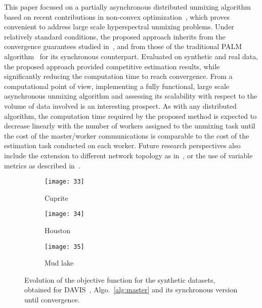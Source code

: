 \documentclass[journal,final,letterpaper,twoside,twocolumn]{IEEEtran}
\begin{document}
This paper focused on a partially asynchronous distributed unmixing algorithm based on recent contributions in non-convex optimization~\cite{Cannelli2016,Chang2016,Davis2016}, which proves convenient to address large scale hyperspectral unmixing problems. Under relatively standard conditions, the proposed approach inherits from the convergence guarantees studied in~\cite{Cannelli2016}, and from those of the traditional PALM algorithm~\cite{Bolte2013,Chouzenoux2016} for its synchronous counterpart. Evaluated on synthetic and real data, the proposed approach provided competitive estimation results, while significantly reducing the computation time to reach convergence. From a computational point of view, implementing a fully functional, large scale asynchronous unmixing algorithm and assessing its scalability with respect to the volume of data involved is an interesting prospect. As with any distributed algorithm, the computation time required by the proposed method
is expected to decrease linearly with the number of workers assigned to the unmixing task until the cost of the master/worker communications is comparable to the cost of the estimation task conducted on each worker. Future research perspectives also include the extension to different network topology as in~\cite{Pesquet2014,Bianchi2016}, or the use of variable metrics as described in~\cite{Repetti2014,Chouzenoux2014,Chouzenoux2016,Frankel2015}.


\begin{appendix}

\end{appendix}





\begin{figure*}[t!]
    \centering
    \begin{subfigure}[t]{0.32\textwidth}
    	\centering	\texttt{[image: 33]}
    	\caption{Cuprite}
    	\label{fig:f_cuprite}
    \end{subfigure}
    \begin{subfigure}[t]{0.32\textwidth}
    	\centering	\texttt{[image: 34]}
    	\caption{Houston}
    	\label{fig:f_houston}
    \end{subfigure}
    \begin{subfigure}[t]{0.32\textwidth}
    	\centering	\texttt{[image: 35]}
    	\caption{Mud lake}
    	\label{fig:f_mud}
    \end{subfigure}
    \caption{Evolution of the objective function for the synthetic datasets, obtained for DAVIS~\cite{Davis2016}, Algo.~\ref{alg:master} and its synchronous version until convergence.}
    \label{fig:objective_real}
\end{figure*}
\end{document}
